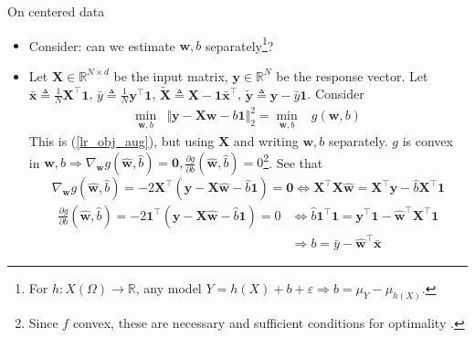 \documentclass{beamer}
\numberwithin{equation}{section}
\newcommand{\aref}[1]{\alert{\ref{#1}}}
\begin{document}
\begin{frame}{On centered data}
    \begin{itemize}
        \item
        Consider: can we estimate $ \mathbf{w}, b $ separately\footnote{
            For $ h : X(\Omega) \rightarrow \mathbb{R} $, any model
            $ Y = h(X) + b + \varepsilon \Rightarrow b = \mu_Y - \mu_{h(X)} $.
        }?

        \item
        Let $ \mathbf{X} \in \mathbb{R}^{N \times d} $ be the input matrix,
        $ \mathbf{y} \in \mathbb{R}^N $ be the response vector. Let
        $ \bar{\mathbf{x}} \triangleq \frac{1}{N}\mathbf{X}^\top\mathbf{1} $,
        $ \bar{y} \triangleq \frac{1}{N}\mathbf{y}^\top\mathbf{1} $,
        $ \tilde{\mathbf{X}} \triangleq \mathbf{X} -
        \mathbf{1}\bar{\mathbf{x}}^\top $, $ \tilde{\mathbf{y}} \triangleq
        \mathbf{y} - \bar{y}\mathbf{1} $. Consider
        \begin{equation*}
            \begin{array}{lll}
                \displaystyle\min_{\mathbf{w}, b} &
                \Vert\mathbf{y} - \mathbf{Xw} - b\mathbf{1}\Vert_2^2 =
                \displaystyle\min_{\mathbf{w}, b} & g(\mathbf{w}, b)
            \end{array}
        \end{equation*}
        This is (\aref{lr_obj_aug}), but using $ \mathbf{X} $ and writing
        $ \mathbf{w}, b $ separately. $ g $ is convex in $ \mathbf{w}, b
        \Rightarrow \nabla_\mathbf{w}g(\hat{\mathbf{w}}, \hat{b}) =
        \mathbf{0}, \frac{\partial g}{\partial b}(\hat{\mathbf{w}}, \hat{b})
        = 0 $\footnote{
            Since $ f $ convex, these are necessary and sufficient conditions
            for optimality \cite{bv_convex_opt}.
        }. See that
        \begin{equation*}
            \nabla_\mathbf{w} g(\hat{\mathbf{w}}, \hat{b}) =
            -2\mathbf{X}^\top(\mathbf{y} - \mathbf{X}\hat{\mathbf{w}} -
            \hat{b}\mathbf{1}) = \mathbf{0} \Leftrightarrow
            \mathbf{X}^\top\mathbf{X}\hat{\mathbf{w}} =
            \mathbf{X}^\top\mathbf{y} - \hat{b}\mathbf{X}^\top\mathbf{1}            
        \end{equation*}
        \begin{equation*}
            \begin{split}
                \frac{\partial g}{\partial b}(\hat{\mathbf{w}}, \hat{b}) =
	            -2\mathbf{1}^\top(\mathbf{y} - \mathbf{X}\hat{\mathbf{w}} -
	            \hat{b}\mathbf{1}) = 0 & \Leftrightarrow
	            \hat{b}\mathbf{1}^\top\mathbf{1} = \mathbf{y}^\top\mathbf{1} -
	            \hat{\mathbf{w}}^\top\mathbf{X}^\top\mathbf{1} \\
	            & \Rightarrow b = \bar{y} - \hat{\mathbf{w}}^\top\bar{\mathbf{x}}
            \end{split}
        \end{equation*}        
    \end{itemize}

    \medskip
\end{frame}
\end{document}
